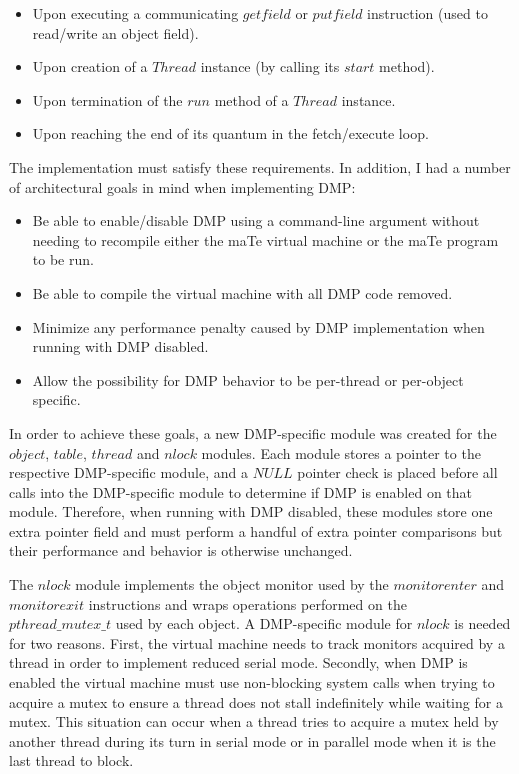 \begin{itemize}
\item Upon executing a communicating $getfield$ or $putfield$
  instruction (used to read/write an object field).
\item Upon creation of a $Thread$ instance (by calling its $start$
  method).
\item Upon termination of the $run$ method of a $Thread$ instance.
\item Upon reaching the end of its quantum in the fetch/execute loop.
\end{itemize}

The implementation must satisfy these requirements.  In addition, I
had a number of architectural goals in mind when implementing DMP:

\begin{itemize}
\item Be able to enable/disable DMP using a command-line argument
  without needing to recompile either the maTe virtual machine or the
  maTe program to be run.
\item Be able to compile the virtual machine with all DMP code
  removed.
\item Minimize any performance penalty caused by DMP implementation
  when running with DMP disabled.
\item Allow the possibility for DMP behavior to be per-thread or
  per-object specific.
\end{itemize}

In order to achieve these goals, a new DMP-specific module was created
for the $object$, $table$, $thread$ and $nlock$ modules.  Each module
stores a pointer to the respective DMP-specific module, and a $NULL$
pointer check is placed before all calls into the DMP-specific module
to determine if DMP is enabled on that module.  Therefore, when
running with DMP disabled, these modules store one extra pointer field
and must perform a handful of extra pointer comparisons but their
performance and behavior is otherwise unchanged.

The $nlock$ module implements the object monitor used by the
$monitorenter$ and $monitorexit$ instructions and wraps operations
performed on the $pthread\_mutex\_t$ used by each object.  A
DMP-specific module for $nlock$ is needed for two reasons.  First, the
virtual machine needs to track monitors acquired by a thread in order
to implement reduced serial mode.  Secondly, when DMP is enabled the
virtual machine must use non-blocking system calls when trying to
acquire a mutex to ensure a thread does not stall indefinitely while
waiting for a mutex.  This situation can occur when a thread tries to
acquire a mutex held by another thread during its turn in serial mode
or in parallel mode when it is the last thread to block.

